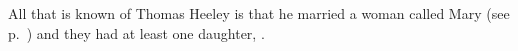 
All that is known of Thomas Heeley is that he married a woman called Mary (see p.~\pageref{Mary_Heeley}) and they had at least one daughter, .
